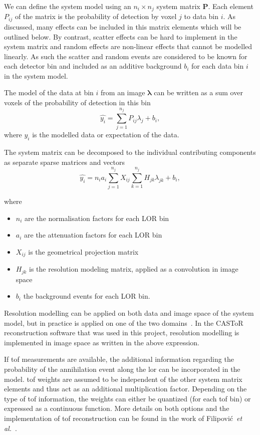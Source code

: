 We can define the system model using an $n_i \times n_j$ system matrix $\bm{P}$. Each element $P_{ij}$ of the matrix is the probability of detection by voxel $j$ to data bin $i$. 
As discussed, many effects can be included in this matrix elements which will be outlined below. By contrast, scatter effects can be hard to implement in the system matrix and random effects are non-linear effects that cannot be modelled linearly. As such the scatter and random events are considered to be known for each detector bin and included as an additive background $b_i$ for each data bin $i$ in the system model.

The model of the data at bin $i$ from an image $\bm{\lambda}$ can be written as a sum over voxels of the probability of detection in this bin 
\begin{equation}
   \hat{y_i} = \sum_{j=1}^{n_j} P_{ij} \lambda_j + b_i ,
   \label{eqn:system_model}
\end{equation}
where $\hat{y_i}$ is the modelled data or expectation of the data.

The system matrix can be decomposed to the individual contributing components as separate sparse matrices and vectors
\begin{equation}
   \hat{y_i} = n_i a_i \sum_{j=1}^{n_j} X_{ij} \sum_{k=1}^{n_j} H_{jk} \lambda_{jk} + b_i ,
\end{equation}

where
\begin{itemize}
    \item $n_i$ are the normalisation factors for each LOR bin
    \item $a_i$ are the attenuation factors for each LOR bin
    \item $X_{ij}$ is the geometrical projection matrix
    \item $H_{jk}$ is the resolution modeling matrix, applied as a convolution in image space
    \item $b_i$ the background events for each LOR bin.
\end{itemize}
%
Resolution modelling can be applied on both data and image space of the system model, but in practice is applied on one of the two domains~\cite{Stute2013}. In the CASToR reconstruction software that was used in this project, resolution modelling is implemented in image space as written in the above expression.

If \gls{tof} measurements are available, the additional information regarding the probability of the annihilation event along the \gls{lor} can be incorporated in the model. \Gls{tof} weights are assumed to be independent of the other system matrix elements and thus act as an additional multiplication factor. Depending on the type of \gls{tof} information, the weights can either be quantized (for each \gls{tof} bin) or expressed as a continuous function. More details on both options and the implementation of \gls{tof} reconstruction can be found in the work of Filipović~\textit{et al.}~\cite{Filipovic_2019}. 
%
